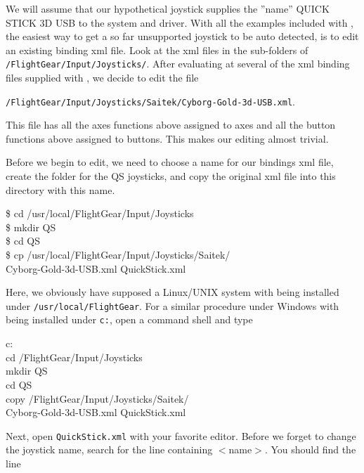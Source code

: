 We will assume that our hypothetical joystick supplies the ''name'' QUICK STICK 3D USB to the system and driver. With all the examples included with \FlightGear{}, the easiest way to get a so far unsupported joystick to be auto detected, is to edit an existing binding xml file.  Look at the xml files in the sub-folders of \texttt{/FlightGear/Input/Joysticks/}. After evaluating at several of the xml binding files supplied with \FlightGear{}, we decide to edit the file

\noindent
 \texttt{/FlightGear/Input/Joysticks/Saitek/Cyborg-Gold-3d-USB.xml}. 
 
 \noindent
  This file has all the axes functions above assigned to axes and all the button functions above assigned to buttons.  This makes our editing almost trivial.

Before we begin to edit, we need to choose a name for our bindings xml file, create the folder for the QS joysticks, and copy the original xml file into this directory with this name.
\medskip


\begin{ttfamily}
\noindent
\$ cd /usr/local/FlightGear/Input/Joysticks\\
\$ mkdir QS\\
\$ cd QS\\
\$ cp  /usr/local/FlightGear/Input/Joysticks/Saitek/\\
Cyborg-Gold-3d-USB.xml  QuickStick.xml
\end{ttfamily}
\medskip

\noindent
Here, we obviously have supposed a Linux/UNIX system with \FlightGear{} being installed under \texttt{/usr/local/FlightGear}. For a similar procedure under Windows with \FlightGear{} being installed under \texttt{c:\FlightGear}, open a command shell and type
\medskip

\begin{ttfamily}
\noindent
c:\\
cd /FlightGear/Input/Joysticks\\
mkdir QS\\
cd QS\\
copy  /FlightGear/Input/Joysticks/Saitek/\\
Cyborg-Gold-3d-USB.xml  QuickStick.xml
\end{ttfamily}
\medskip

\noindent
Next, open \texttt{QuickStick.xml} with your favorite editor.  Before we forget to change the joystick name, search for the line containing $<$name$>$.  You should find the line
\medskip

